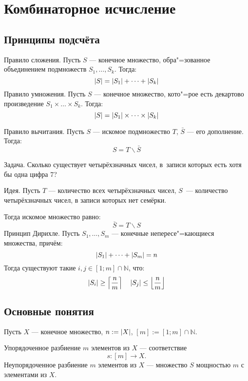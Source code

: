 \section{Комбинаторное исчисление}





\subsection{Принципы подсчёта}

{\bold Правило сложения.} Пусть $S$ --- конечное множество, обра"=зованное объединением подмножеств $S_1,\dots,S_k$. Тогда:
$$\left|S\right|=\left|S_1\right|+\dots+\left|S_k\right|$$
{\bold Правило умножения.} Пусть $S$ --- конечное множество, кото"=рое есть декартово произведение $S_1\times\dots\times S_k$. Тогда:
$$\left|S\right|=\left|S_1\right|\times\dots\times\left|S_k\right|$$
\begin{theorem}
{\bold Правило вычитания.} Пусть $S$ --- искомое подмножество $T$, $\bar{S}$ --- его дополнение. Тогда:
$$S=T\backslash\bar{S}$$
\end{theorem}
\begin{theorem}
{\bold Задача.} Сколько существует четырёхзначных чисел, в~записи которых есть хотя бы одна цифра 7?
\end{theorem}
{\bold Идея.} Пусть $T$ --- количество всех четырёхзначных чисел, $S$~--- количество четырёхзначных чисел, в записи которых {\ital нет семёрки}.

Тогда искомое множество равно:
$$\bar{S}=T\backslash S$$
{\bold Принцип Дирихле.} Пусть $S_1,\dots,S_m$ --- конечные непересе"=кающиеся множества, причём:
$$\left|S_1\right|+\dots+\left|S_m\right|=n$$
Тогда существуют такие $i,j\in[1;m]\cap\mathbb{N}$, что:
$$\left|S_i\right|\geq\left\lceil\frac{n}{m}\right\rceil\quad\left|S_j\right|\leq\left\lfloor\frac{n}{m}\right\rfloor$$

\subsection{Основные понятия}

Пусть $X$ --- конечное множество, $n:=\left|X\right|$, $[m]:=[1;m]\cap\mathbb{N}$.

{\ital Упорядоченное разбиение} $m$ элементов из $X$ --- соответствие
$$s\colon[m]\to X.$$
{\ital Неупорядоченное разбиение} $m$ элементов из $X$ --- множество $S$ мощностью $m$ с элементами из $X$.

